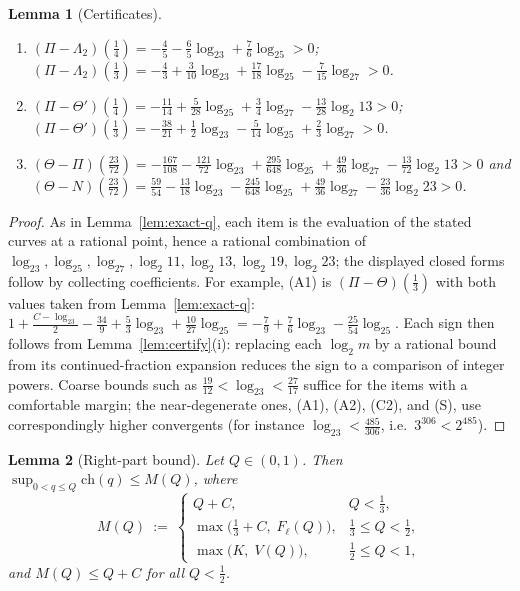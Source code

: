 \documentclass[journal]{IEEEtran}
\newtheorem{lemma}{Lemma}
\theoremstyle{definition}
\newcommand{\lgg}{\log_2}
\newcommand{\CC}{C}
\begin{document}
\begin{lemma}[Certificates]
\begin{enumerate}
\item[\textup{(D5)}] $(\Pi-\Lambda_2)(\tfrac14)
  =-\tfrac45-\tfrac65\lgg3+\tfrac76\lgg5>0$;\quad
  $(\Pi-\Lambda_2)(\tfrac13)
  =-\tfrac43+\tfrac3{10}\lgg3+\tfrac{17}{18}\lgg5-\tfrac7{15}\lgg7>0$.
\item[\textup{(D6)}] $(\Pi-\Theta')(\tfrac14)
  =-\tfrac{11}{14}+\tfrac5{28}\lgg5+\tfrac34\lgg7-\tfrac{13}{28}\lgg{13}>0$;\quad
  $(\Pi-\Theta')(\tfrac13)
  =-\tfrac{38}{21}+\tfrac12\lgg3-\tfrac5{14}\lgg5+\tfrac23\lgg7>0$.
\item[\textup{(S)}] $(\Theta-\Pi)(\tfrac{23}{72})
  =-\tfrac{167}{108}-\tfrac{121}{72}\lgg3+\tfrac{295}{648}\lgg5
  +\tfrac{49}{36}\lgg7-\tfrac{13}{72}\lgg{13}>0$ and
  $(\Theta-N)(\tfrac{23}{72})
  =\tfrac{59}{54}-\tfrac{13}{18}\lgg3-\tfrac{245}{648}\lgg5
  +\tfrac{49}{36}\lgg7-\tfrac{23}{36}\lgg{23}>0$.
\end{enumerate}
\end{lemma}

\begin{proof}
As in Lemma~\ref{lem:exact-q}, each item is the evaluation of the stated
curves at a rational point, hence a rational combination of
$\lgg3,\lgg5,\lgg7,\lgg{11},\lgg{13},\lgg{19},\lgg{23}$; the displayed
closed forms follow by collecting coefficients. For example, \textup{(A1)}
is $(\Pi-\Theta)(\tfrac13)$ with both values taken from
Lemma~\ref{lem:exact-q}:
$1+\tfrac{\CC-\lgg3}2-\tfrac{34}9+\tfrac53\lgg3+\tfrac{10}{27}\lgg5
=-\tfrac79+\tfrac76\lgg3-\tfrac{25}{54}\lgg5$. Each sign then follows from
Lemma~\ref{lem:certify}\textup{(i)}: replacing each $\lgg m$ by a rational
bound from its continued-fraction expansion reduces the sign to a comparison of
integer powers. Coarse bounds such as $\tfrac{19}{12}<\lgg3<\tfrac{27}{17}$
suffice for the items with a comfortable margin; the near-degenerate ones,
\textup{(A1)}, \textup{(A2)}, \textup{(C2)}, and \textup{(S)}, use
correspondingly higher convergents \textup{(}for instance
$\lgg3<\tfrac{485}{306}$, i.e.\ $3^{306}<2^{485}$\textup{)}.
\end{proof}

\begin{lemma}[Right-part bound]\label{lem:msup-q}
Let $Q\in(0,1)$. Then $\sup_{0<q\le Q}\mathrm{ch}(q)\le M(Q)$, where
\[
  M(Q)\ :=\
  \begin{cases}
    Q+\CC, & Q<\tfrac13,\\[2pt]
    \max\bigl(\tfrac13+\CC,\;F_\ell(Q)\bigr), & \tfrac13\le Q<\tfrac12,\\[2pt]
    \max\bigl(K,\;V(Q)\bigr), & \tfrac12\le Q<1 ,
  \end{cases}
\]
and $M(Q)\le Q+\CC$ for all $Q<\tfrac12$.
\end{lemma}
\end{document}
